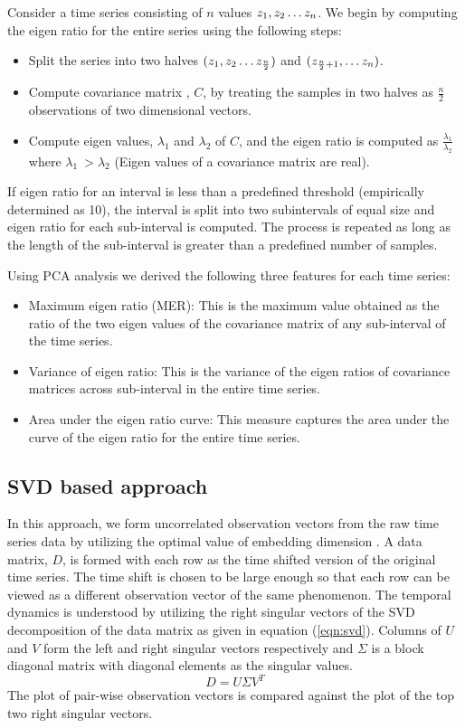 \documentclass[10pt,conference]{IEEEtran}
\begin{document}
Consider a time series consisting of $n$ values  $z_1, z_2 \mathellipsis z_n$. We begin by computing the eigen ratio for the entire series using the following steps:
\begin{itemize}
  \item  Split the series into two halves $(z_1, z_2 \mathellipsis z_{\frac{n}{2}})$ and $(z_{\frac{n}{2} + 1}, \mathellipsis z_n)$.
  \item Compute covariance matrix , $C$,  by treating the samples in two halves as $\frac{n}{2}$ observations of two dimensional vectors.
  \item Compute eigen values, $\lambda_1$ and $\lambda_2$ of $C$,  and the eigen ratio is computed as  $\frac{\lambda_1}{\lambda_2}$ where $\lambda_1 \ > \lambda_2$ (Eigen values of a covariance matrix are real).
\end{itemize}
If eigen ratio for an interval is less than a predefined threshold (empirically determined as 10), the interval is split into two subintervals of equal size and eigen ratio for each sub-interval is computed. The process is repeated as long as the length of the sub-interval is greater than a predefined number of samples.

Using PCA analysis we derived the following three features for each time series:
\begin{itemize}
  \item Maximum eigen ratio (MER): This is the maximum value obtained as the ratio of the two eigen values of the covariance matrix of any sub-interval of the time series.
  \item Variance of eigen ratio: This is the variance of the eigen ratios of covariance matrices across sub-interval in the entire time series.
  \item Area under the eigen ratio curve: This measure captures the area under the curve of the eigen ratio for the entire time series.
\end{itemize}


\subsection{SVD based approach}
In this approach, we form uncorrelated observation vectors from the raw time series data by utilizing the optimal value of embedding dimension \cite{misra2006}. A data matrix, $D$, is formed with each row  as the  time shifted version of the original time series. The time shift is chosen to be large enough so that each row can be viewed as a different observation vector of the same phenomenon. The temporal dynamics is understood by utilizing the right singular vectors of the SVD decomposition of the data matrix as given in equation (\ref{eqn:svd}). Columns of $U$ and $V$  form the left and right singular vectors respectively and $\Sigma$ is a block diagonal matrix with diagonal elements as the singular values.
\begin{equation}
  D = U \Sigma V^T
  \label{eqn:svd}
\end{equation}
   The plot of pair-wise observation vectors is compared against the plot of the top two right singular vectors.
\end{document}
